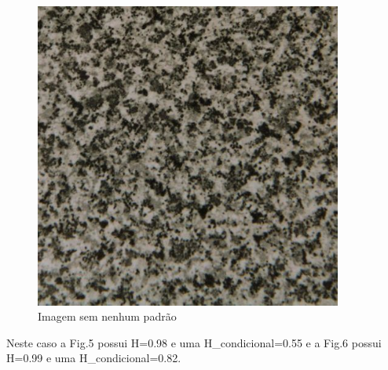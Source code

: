 \documentclass[12pt]{article}
\begin{document}
\begin{figure}[htb!]
\begin{minipage}{0.45\textwidth}
        \includegraphics[width=0.9\textwidth]{granito.jpg} 
        \caption{Imagem sem nenhum padrão}
    \end{minipage}
\end{figure}

\centering
Neste caso a Fig.5 possui H=0.98 e uma H\_condicional=0.55 e a Fig.6 possui H=0.99 e uma H\_condicional=0.82.
\end{document}
